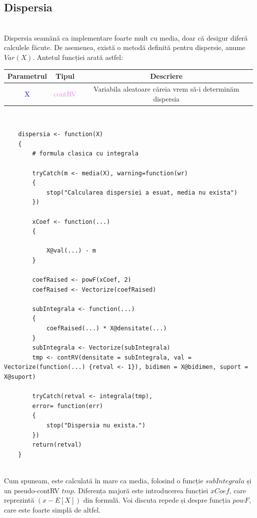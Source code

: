 \documentclass[12pt]{article}
\begin{document}
\subsection{Dispersia} \hfill \\
\indent Dispersia seamănă ca implementare foarte mult cu media, doar că desigur diferă calculele făcute. De asemenea, există o metodă definită pentru dispersie, anume $Var(X)$. Antetul funcției arată astfel:
\begin{center}
	\begin{tabular}{|| c | c | c ||}
		\hline
		Parametrul & Tipul & Descriere \\
		\hline
		\textcolor{blue}{X} & \textcolor{violet}{contRV} & Variabila aleatoare căreia vrem să-i determinăm dispersia\\
		\hline
	\end{tabular}
\end{center}\hfill \\
\begin{lstlisting}
	dispersia <- function(X)
	{
		# formula clasica cu integrala
		
		tryCatch(m <- media(X), warning=function(wr)
		{
			stop("Calcularea dispersiei a esuat, media nu exista")
		})
		
		xCoef <- function(...)
		{
			
			X@val(...) - m
		}
		
		coefRaised <- powF(xCoef, 2)
		coefRaised <- Vectorize(coefRaised)
		
		subIntegrala <- function(...)
		{
			coefRaised(...) * X@densitate(...)
		}
		subIntegrala <- Vectorize(subIntegrala)
		tmp <- contRV(densitate = subIntegrala, val = Vectorize(function(...) {retval <- 1}), bidimen = X@bidimen, suport = X@suport)
		
		tryCatch(retval <- integrala(tmp),
		error= function(err)
		{
			stop("Dispersia nu exista.")
		})
		return(retval)
	}
\end{lstlisting}\hfill \\
\indent Cum spuneam, este calculată în mare ca media, folosind o funcție $subIntegrala$ și un pseudo-contRV $tmp$. Diferența majoră este introducerea funcției $xCoef$, care reprezintă $(x - E[X])$ din formulă. Voi discuta repede și despre funcția $powF$, care este foarte simplă de altfel. \\
\end{document}
